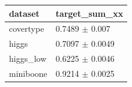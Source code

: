 \begin{tabular}{ll}
\toprule
dataset & target\_sum\_xx \\
\midrule
covertype & 0.7489 $\pm$ 0.007 \\
higgs & 0.7097 $\pm$ 0.0049 \\
higgs\_low & 0.6225 $\pm$ 0.0046 \\
miniboone & 0.9214 $\pm$ 0.0025 \\
\bottomrule
\end{tabular}
